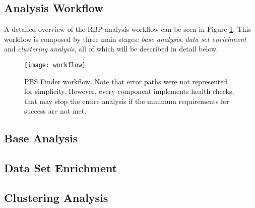 \subsection{Analysis Workflow}


A detailed overview of the RBP analysis workflow can be seen in Figure
\ref{fig:workflow}. This workflow is composed by three main stages: \emph{base
analysis}, \emph{data set enrichment} and \emph{clustering analysis}, all of
which will be described in detail below.

\begin{figure}[!htb]
  \begin{center}
    \leavevmode
    \texttt{[image: workflow]}
    \caption[PBS Finder workflow]{
      PBS Finder workflow. Note that error paths were not represented for
      simplicity. However, every component implements health checks, that may
      stop the entire analysis if the minimum requirements for success are not
      met.
    }
    \label{fig:workflow}
  \end{center}
\end{figure}

\subsection{Base Analysis}

\subsection{Data Set Enrichment}

\subsection{Clustering Analysis}

